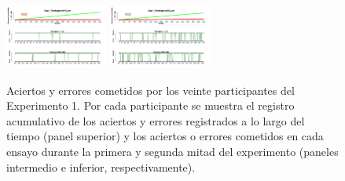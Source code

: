 \begin{figure}[th]
\includegraphics[width=0.30\textwidth]{Figures/Success_Exp1_P19} \includegraphics[width=0.30\textwidth]{Figures/Success_Exp1_P20} 
\caption[Aciertos y Errores a lo largo del tiempo; Experimento 1]{Aciertos y errores cometidos por los veinte participantes del Experimento 1. Por cada participante se muestra el registro acumulativo de los aciertos y errores registrados a lo largo del tiempo (panel superior) y los aciertos o errores cometidos en cada ensayo durante la primera y segunda mitad del experimento (paneles intermedio e inferior, respectivamente).}
\label{fig:Success_E1}
\end{figure}

